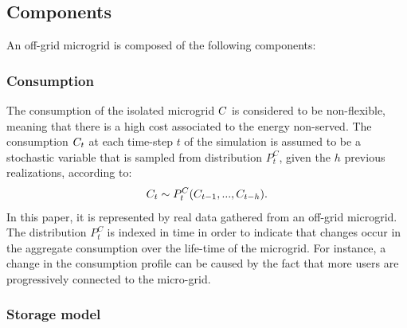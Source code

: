 \documentclass{article}
\begin{document}
\subsection{Components}

An off-grid microgrid is composed of the following components:
 
\subsubsection{Consumption} 
    
    The consumption of the isolated microgrid $C$ is considered to be non-flexible, meaning that there is a high cost associated to the energy non-served. The consumption $C_{t}$ at each time-step $t$ of the simulation is assumed to be a stochastic variable that is sampled from distribution $P^{C}_{t}$, given the $h$ previous realizations, according to:
    \begin{gather}
    C_{t} \sim P^{C}_{t}( C_{t-1}, ...,C_{t-h} ).\label{eqn: load}
    \end{gather}
    In this paper, it is represented by real data gathered from an off-grid microgrid. The distribution $P^{C}_{t}$ is indexed in time in order to indicate that changes occur in the aggregate consumption over the life-time of the microgrid. For instance, a change in the consumption profile can be caused by the fact that more users are progressively connected to the micro-grid.

\subsubsection{Storage model}
    
\end{document}

